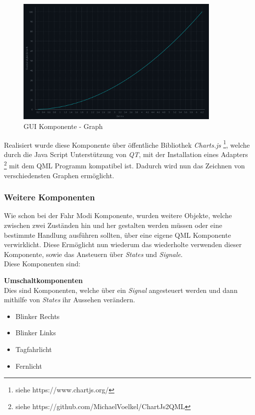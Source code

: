 \begin{figure}[H]
	\begin{center}
		\includegraphics[width=10cm]{figures/hcis/component_graph.png}
		\caption{GUI Komponente - Graph}
				\label{fig:kompGraph}
	\end{center}
\end{figure}

Realisiert wurde diese Komponente über öffentliche Bibliothek \textit{Charts.js} \footnote{siehe https://www.chartjs.org/}, welche durch die Java Script Unterstützung von \textit{QT}, mit der Installation eines Adapters \footnote{siehe https://github.com/MichaelVoelkel/ChartJs2QML} mit dem QML Programm kompatibel ist. Dadurch wird nun das Zeichnen von verschiedensten Graphen ermöglicht.

\subsubsection{Weitere Komponenten}

Wie schon bei der Fahr Modi Komponente, wurden weitere Objekte, welche zwischen zwei Zuständen hin und her gestalten werden müssen oder eine bestimmte Handlung ausführen sollten, über eine eigene QML Komponente verwirklicht. Diese Ermöglicht nun wiederum das wiederholte verwenden dieser Komponente, sowie das Ansteuern über \textit{States} und \textit{Signale}.\\
Diese Komponenten sind:

\textbf{Umschaltkomponenten}\\
Dies sind Komponenten, welche über ein \textit{Signal} angesteuert werden und dann mithilfe von \textit{States} ihr Aussehen verändern.

\begin{itemize}
	
	\item Blinker Rechts
	\item Blinker Links
	\item Tagfahrlicht
	\item Fernlicht
	
\end{itemize}


